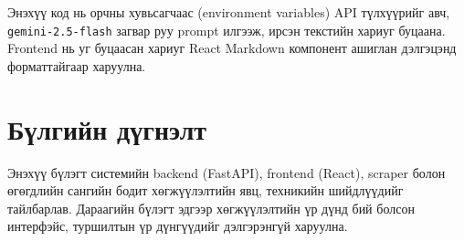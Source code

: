 Энэхүү код нь орчны хувьсагчаас (environment variables) API түлхүүрийг авч, \texttt{gemini-2.5-flash} загвар руу prompt илгээж, ирсэн текстийн хариуг буцаана. Frontend нь уг буцаасан хариуг React Markdown компонент ашиглан дэлгэцэнд форматтайгаар харуулна.

\section{Бүлгийн дүгнэлт}
Энэхүү бүлэгт системийн backend (FastAPI), frontend (React), scraper болон өгөгдлийн сангийн бодит хөгжүүлэлтийн явц, техникийн шийдлүүдийг тайлбарлав. Дараагийн бүлэгт эдгээр хөгжүүлэлтийн үр дүнд бий болсон интерфэйс, туршилтын үр дүнгүүдийг дэлгэрэнгүй харуулна.
